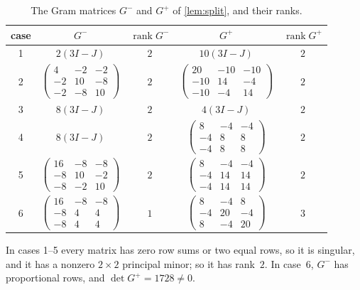 \documentclass[11pt,a4paper]{amsart}
\theoremstyle{definition}
\theoremstyle{remark}
\newcommand{\rk}{\operatorname{rank}}
\begin{document}
\begin{table}[H]
\caption{The Gram matrices $G^-$ and $G^+$ of \cref{lem:split}, and their ranks.}
\label{tab:gram}
\vspace{4pt}
\small
\renewcommand{\arraystretch}{1.6}
\begin{tabular}{@{}ccccc@{}}
\toprule
case & $G^-$ & $\rk G^-$ & $G^+$ & $\rk G^+$\\
\midrule
1 & $2(3I-J)$ & $2$ & $10(3I-J)$ & $2$\\
2 & $\left(\begin{smallmatrix}4&-2&-2\\-2&10&-8\\-2&-8&10\end{smallmatrix}\right)$ & $2$ &
    $\left(\begin{smallmatrix}20&-10&-10\\-10&14&-4\\-10&-4&14\end{smallmatrix}\right)$ & $2$\\
3 & $8(3I-J)$ & $2$ & $4(3I-J)$ & $2$\\
4 & $8(3I-J)$ & $2$ & $\left(\begin{smallmatrix}8&-4&-4\\-4&8&8\\-4&8&8\end{smallmatrix}\right)$ & $2$\\
5 & $\left(\begin{smallmatrix}16&-8&-8\\-8&10&-2\\-8&-2&10\end{smallmatrix}\right)$ & $2$ &
    $\left(\begin{smallmatrix}8&-4&-4\\-4&14&14\\-4&14&14\end{smallmatrix}\right)$ & $2$\\
6 & $\left(\begin{smallmatrix}16&-8&-8\\-8&4&4\\-8&4&4\end{smallmatrix}\right)$ & $1$ &
    $\left(\begin{smallmatrix}8&-4&8\\-4&20&-4\\8&-4&20\end{smallmatrix}\right)$ & $3$\\
\bottomrule
\end{tabular}
\par\medskip
In cases 1--5 every matrix has zero row sums or two equal rows, so it is singular, and it has a nonzero
$2\times2$ principal minor; so it has rank~$2$. In case~6, $G^-$ has proportional rows, and $\det G^+=1728\neq0$.
\end{table}
\end{document}
